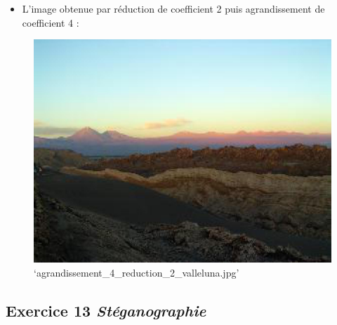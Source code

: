 \documentclass[11pt]{article}
\makeatletter
\def\maxwidth{\ifdim\Gin@nat@width>\linewidth\linewidth
    \else\Gin@nat@width\fi}
\let\Oldincludegraphics\includegraphics
\renewcommand{\includegraphics}[1]{\Oldincludegraphics[width=.8\maxwidth]{#1}}
\providecommand{\tightlist}{%
      \setlength{\itemsep}{0pt}\setlength{\parskip}{0pt}}
\makeatother
\begin{document}
\begin{itemize}
\tightlist
\item
  L'image obtenue par réduction de coefficient 2 puis agrandissement de
  coefficient 4 :
\end{itemize}

\begin{figure}
\centering
\includegraphics{agrandissement_4_reduction_2_valleluna.jpg}
\caption{`agrandissement\_4\_reduction\_2\_valleluna.jpg'}
\end{figure}

    \hypertarget{exercice-13-stuxe9ganographie}{%
\subsection{\texorpdfstring{Exercice 13
\emph{Stéganographie}}{Exercice 13 Stéganographie}}\label{exercice-13-stuxe9ganographie}}
\end{document}
